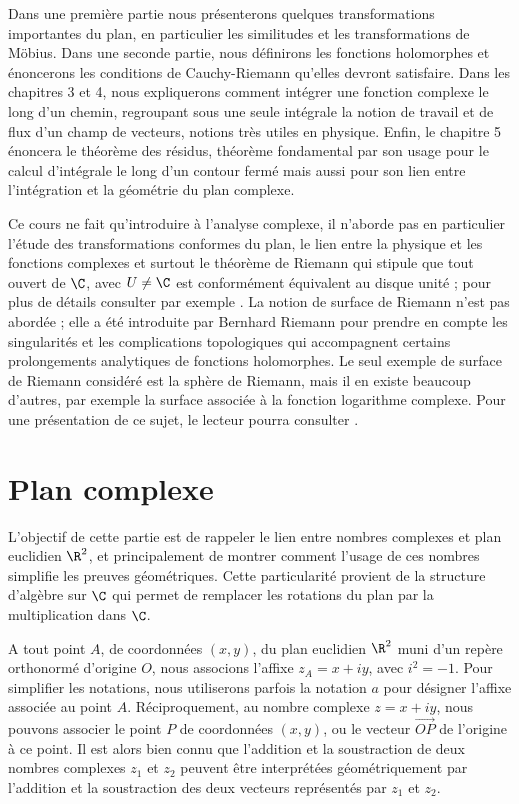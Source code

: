 Dans une première partie nous présenterons quelques transformations importantes du plan, en particulier les similitudes et les transformations de Möbius. Dans une seconde partie, nous définirons les fonctions holomorphes et énoncerons les conditions de Cauchy-Riemann qu'elles devront satisfaire. Dans les chapitres 3 et 4, nous expliquerons comment intégrer une fonction complexe le long d'un chemin, regroupant sous une seule intégrale la notion de travail et de flux d'un champ de vecteurs, notions très utiles en physique. Enfin, le chapitre 5 énoncera le théorème des résidus, théorème fondamental par son usage pour le calcul d'intégrale le long d'un contour fermé mais aussi pour son lien entre l'intégration et la géométrie du plan complexe.

Ce cours ne fait qu'introduire à l'analyse complexe, il n'aborde pas en particulier l'étude des transformations conformes du plan, le lien entre la physique et les fonctions complexes et surtout le théorème de Riemann qui stipule que tout ouvert de $\C$, avec $U \neq \C$ est conformément équivalent au disque unité ; pour plus de détails consulter par exemple \cite{nehari2012conformal}. La notion de surface de Riemann n'est pas abordée ; elle a été introduite par Bernhard Riemann pour prendre en compte les singularités et les complications topologiques qui accompagnent certains prolongements analytiques de fonctions holomorphes. Le seul exemple de surface de Riemann considéré est la sphère de Riemann, mais il en existe beaucoup d'autres, par exemple la surface associée à la fonction logarithme complexe. Pour une présentation de ce sujet, le lecteur pourra consulter \cite{de2010uniformisation}.


\section{Plan complexe}

L'objectif de cette partie est de rappeler le lien entre nombres complexes et plan euclidien $\R^2$, et principalement de montrer comment l'usage de ces nombres simplifie les preuves géométriques. Cette particularité provient de la structure d'algèbre sur $\C$ qui permet de remplacer les rotations du plan par la multiplication dans $\C$.

A tout point $A$, de coordonnées $(x,y)$, du plan euclidien $\R^2$ muni d'un repère orthonormé d'origine $O$, nous associons l'affixe $z_A=x+ i y$, avec $i^2=-1$. Pour simplifier les notations, nous utiliserons parfois la notation $a$ pour désigner l'affixe associée au point $A$. Réciproquement, au nombre complexe $z=x+iy$, nous pouvons associer le point $P$ de coordonnées $(x,y)$, ou le vecteur $\stackrel{\longrightarrow}{OP}$ de l'origine à ce point. Il est alors bien connu que l'addition et la soustraction de deux nombres complexes $z_1$ et $z_2$ peuvent être interprétées géométriquement par l'addition et la soustraction des deux vecteurs représentés par $z_1$ et $z_2$. 


